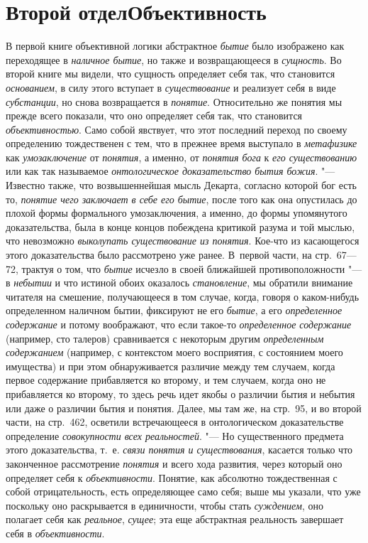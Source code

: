 \clearpage\part[Второй отдел\newline ОБЪЕКТИВНОСТЬ]{Второй отдел\newline Объективность}
В первой книге объективной логики абстрактное {\em бытие} было
изображено как переходящее в {\em наличное бытие}, но
также и возвращающееся в {\em сущность}. Во второй
книге мы видели, что сущность определяет себя так, что становится
{\em основанием}, в силу этого вступает в {\em существование}
и реализует себя в виде {\em субстанции}, но
снова возвращается в {\em понятие}.
Относительно же понятия мы прежде всего показали, что оно
определяет себя так, что становится {\em объективностью}.
Само собой явствует, что этот последний переход по своему
определению тождественен с тем, что в прежнее время выступало в
{\em метафизике} как {\em умозаключение} от {\em понятия}, а именно,
от {\em понятия бога} к {\em его существованию} или как так называемое
{\em онтологическое доказательство бытия
божия}. "--- Известно также, что возвышеннейшая мысль Декарта,
согласно которой бог есть то, {\em понятие чего заключает в себе его
бытие}, после того как она опустилась до плохой формы
формального умозаключения, а именно, до формы упомянутого доказательства,
была в конце концов побеждена критикой разума и той мыслью, что невозможно
{\em выколупать существование из
понятия}. Кое-что из касающегося этого доказательства было
рассмотрено уже ранее. В~первой части, на стр.~67---72, трактуя о том, что
{\em бытие} исчезло в своей ближайшей противоположности "--- в
{\em небытии} и что истиной обоих оказалось {\em становление}, мы
обратили внимание читателя на смешение, получающееся в том случае, когда,
говоря о каком-нибудь определенном наличном бытии, фиксируют не его
{\em бытие}, а его {\em определенное содержание}
и потому воображают, что если такое-то {\em определенное содержание}
(например, сто талеров) сравнивается с некоторым другим
{\em определенным содержанием}
(например, с контекстом моего восприятия, с состоянием моего
имущества) и при этом обнаруживается различие между тем случаем, когда
первое содержание прибавляется ко второму, и тем случаем, когда оно не
прибавляется ко второму, то здесь речь идет якобы о различии бытия и
небытия или даже о различии бытия и понятия. Далее, мы там же, на стр.~95,
и во второй части, на стр.~462, осветили встречающееся в онтологическом
доказательстве определение {\em совокупности всех реальностей}. "---
Но существенного предмета этого доказательства, т.~е.
{\em связи понятия и существования},
касается только что законченное рассмотрение {\em понятия} и всего
хода развития, через который оно определяет себя к {\em объективности}.
Понятие, как абсолютно тождественная с собой отрицательность,
есть определяющее само себя; выше мы указали, что уже поскольку оно
раскрывается в единичности, чтобы стать {\em суждением}, оно
полагает себя как {\em реальное}, {\em сущее}; эта еще
абстрактная реальность завершает себя в {\em объективности}.

